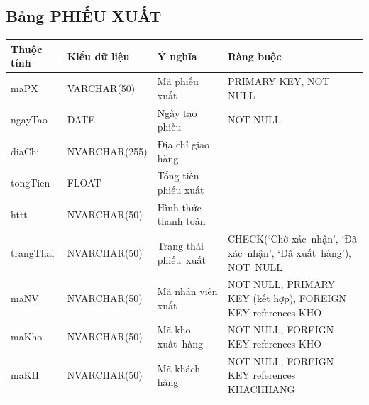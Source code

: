 \documentclass[a4paper,12pt]{report}
\begin{document}
\subsection{Bảng PHIẾU XUẤT}
\noindent
\begin{center}
    \begin{longtable}{|>{\centering\arraybackslash}p{3cm}|
        >{\centering\arraybackslash}p{4cm}|
        >{\centering\arraybackslash}p{4cm}|
        >{\centering\arraybackslash}p{4cm}|}
        \hline
        \textbf{Thuộc tính}                                                                                                               &
        \textbf{Kiểu dữ liệu}                                                                                                                             &
        \textbf{Ý nghĩa}                                                                                                 &
        \textbf{Ràng buộc}                                                                                                         \\
        \hline
        maPX &  VARCHAR(50)  & Mã phiếu xuất & PRIMARY KEY, NOT NULL \\
        \hline
        ngayTao & DATE  & Ngày tạo phiếu & NOT NULL \\                                                                                                                          
        \hline
        diaChi & NVARCHAR(255) & Địa chỉ giao hàng &  \\                                                                                                                          
        \hline
        tongTien & FLOAT & Tổng tiền phiếu xuất &  \\                                                                                                                          
        \hline
        httt & NVARCHAR(50) & Hình thức thanh toán & \\                                                                                                                          
        \hline
        trangThai &  NVARCHAR(50)  & Trạng thái phiếu~xuất & CHECK(‘Chờ xác~nhận’, ‘Đã xác~nhận’, ‘Đã xuất~hàng’), NOT~NULL \\
        \hline
        maNV & NVARCHAR(50) & Mã nhân viên xuất & NOT NULL, PRIMARY KEY (kết hợp), FOREIGN KEY references KHO \\                                                                                                                          
        \hline
        maKho & NVARCHAR(50) & Mã kho xuất~hàng & NOT NULL, FOREIGN KEY references KHO \\                                                                                                                          
        \hline
        maKH & NVARCHAR(50) & Mã khách hàng & NOT NULL, FOREIGN KEY references KHACHHANG \\                                                                                                                          
        \hline
    \end{longtable}
\end{center}
\end{document}

